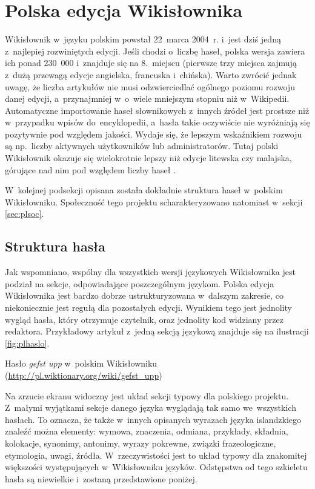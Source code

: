 \documentclass{pracamgr}
\begin{document}
\section{Polska edycja Wikisłownika}
\label{sec:plwikt}
Wikisłownik w~języku polskim powstał 22~marca 2004~r. \cite{wikt:home} i~jest dziś jedną z~najlepiej rozwiniętych edycji. Jeśli chodzi o~liczbę haseł, polska wersja zawiera ich ponad 230~000 i~znajduje się na 8.~miejscu (pierwsze trzy miejsca zajmują z~dużą przewagą edycje angielska, francuska i~chińska). Warto zwrócić jednak uwagę, że liczba artykułów nie musi odzwierciedlać ogólnego poziomu rozwoju danej edycji, a~przynajmniej w~o~wiele mniejszym stopniu niż w~Wikipedii. Automatyczne importowanie haseł słownikowych z~innych źródeł jest prostsze niż w~przypadku wpisów do~encyklopedii, a~hasła takie oczywiście nie wyróżniają się pozytywnie pod względem jakości. Wydaje się, że lepszym wskaźnikiem rozwoju są np.\ liczby aktywnych użytkowników lub administratorów. Tutaj polski Wikisłownik okazuje się wielokrotnie lepszy niż edycje litewska czy malajska, górujące nad nim pod względem liczby haseł \cite{wikt:list}.

W~kolejnej podsekcji opisana została dokładnie struktura haseł w~polskim Wikisłowniku. Społeczność tego projektu scharakteryzowano natomiast w~sekcji \ref{sec:plsoc}.

\subsection{Struktura hasła}
Jak wspomniano, wspólny dla wszystkich wersji językowych Wikisłownika jest podział na sekcje, odpowiadające poszczególnym językom. Polska edycja Wikisłownika jest bardzo dobrze ustrukturyzowana w~dalszym zakresie, co niekoniecznie jest regułą dla pozostałych edycji. Wynikiem tego jest jednolity wygląd hasła, który otrzymuje czytelnik, oraz jednolity kod widziany przez redaktora. Przykładowy artykuł z~jedną sekcją językową znajduje się na ilustracji \ref{fig:plhaslo}.

\begin{illustration}
	\caption{Hasło \emph{gefst upp} w~polskim Wikisłowniku (\protect\url{http://pl.wiktionary.org/wiki/gefst_upp})}
	\label{fig:plhaslo}
\end{illustration}

Na zrzucie ekranu widoczny jest układ sekcji typowy dla polskiego projektu. Z~małymi wyjątkami sekcje danego języka wyglądają tak samo we~wszystkich hasłach. To oznacza, że także w~innych opisanych wyrazach języka islandzkiego znaleźć można elementy: wymowa, znaczenia, odmiana, przykłady, składnia, kolokacje, synonimy, antonimy, wyrazy pokrewne, związki frazeologiczne, etymologia, uwagi, źródła. W~rzeczywistości jest to układ typowy dla znakomitej większości występujących w~Wikisłowniku języków. Odstępstwa od tego szkieletu hasła są niewielkie i~zostaną przedstawione poniżej.
\end{document}
